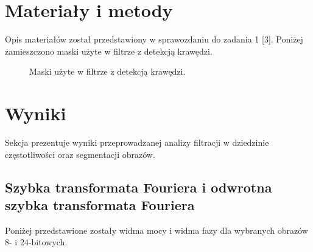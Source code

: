 \documentclass{classrep}
\begin{document}
\section{Materiały i metody}
Opis materiałów został przedstawiony w sprawozdaniu do zadania 1 [3]. Poniżej zamieszczono maski użyte w filtrze z detekcją krawędzi.
\begin{figure}[H]%
    \centering
    \qquad
    \qquad
    \caption{Maski użyte w filtrze z detekcją krawędzi.}%
\end{figure} 

\section{Wyniki}
Sekcja prezentuje wyniki przeprowadzanej analizy filtracji w dziedzinie częstotliwości oraz segmentacji obrazów.

\subsection{Szybka transformata Fouriera i odwrotna szybka transformata Fouriera}
Poniżej przedstawione zostały widma mocy i widma fazy dla wybranych obrazów 8- i 24-bitowych.
\end{document}
